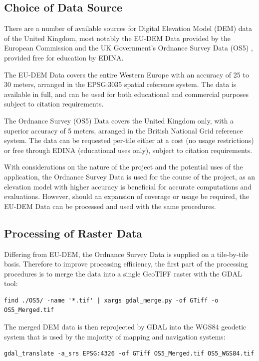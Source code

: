 \documentclass[11pt, oneside]{article}
\begin{document}
	\subsection{Choice of Data Source}
		There are a number of available sources for Digital Elevation Model (DEM) data of the United Kingdom, most notably the EU-DEM Data \cite{eu-dem} provided by the European Commission and the UK Government's Ordnance Survey Data (OS5) \cite{os-5}, provided free for education by EDINA. 
		
		The EU-DEM Data covers the entire Western Europe with an accuracy of 25 to 30 meters, arranged in the EPSG:3035 \cite{epsg-3035} spatial reference system. The data is available in full, and can be used for both educational and commercial purposes subject to citation requirements. 
		
		The Ordnance Survey (OS5) Data covers the United Kingdom only, with a superior accuracy of 5 meters, arranged in the British National Grid \cite{osgb-1936} reference system. The data can be requested per-tile either at a cost (no usage restrictions) or free through EDINA (educational uses only), subject to citation requirements.
		
		With considerations on the nature of the project and the potential uses of the application, the Ordnance Survey Data is used for the course of the project, as an elevation model with higher accuracy is beneficial for accurate computations and evaluations. However, should an expansion of coverage or usage be required, the EU-DEM Data can be processed and used with the same procedures.
		
	\subsection{Processing of Raster Data} \label{subsec:rasterdata}
		Differing from EU-DEM, the Ordnance Survey Data is supplied on a tile-by-tile basis. Therefore to improve processing efficiency, the first part of the processing procedures is to merge the data into a single GeoTIFF \cite{geotiff} raster with the GDAL tool:
		\begin{lstlisting}[breaklines]
find ./OS5/ -name '*.tif' | xargs gdal_merge.py -of GTiff -o OS5_Merged.tif 
		\end{lstlisting}
		
		The merged DEM data is then reprojected by GDAL into the WGS84 geodetic system \cite{wgs84} that is used by the majority of mapping and navigation systems:
		\begin{lstlisting}[breaklines]
gdal_translate -a_srs EPSG:4326 -of GTiff OS5_Merged.tif OS5_WGS84.tif
		\end{lstlisting}
		
\end{document}
